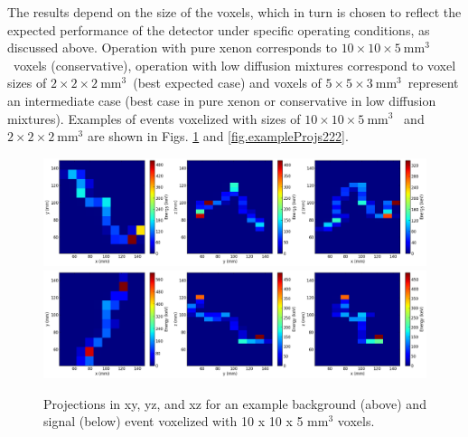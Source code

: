 \documentclass[a4paper,11pt]{article}
\begin{document}
The results depend on the size of the voxels, which in turn is chosen to reflect the expected performance of the detector under specific operating conditions, as discussed above. Operation with pure xenon corresponds to $10 \times 10 \times 5 \mathrm{~mm^3}$~voxels (conservative), operation with low diffusion mixtures correspond to voxel sizes of $2 \times 2 \times 2 \mathrm{~mm^3}$~(best expected case) and voxels of $5 \times 5 \times 3 \mathrm{~mm^3}$~represent an intermediate case (best case in pure xenon or conservative in low diffusion mixtures).  Examples of events voxelized with sizes of $10 \times 10 \times 5 \mathrm{~mm^3}$~ and
$2 \times 2 \times 2 \mathrm{~mm^3}$ are shown in Figs. \ref{fig.exampleProjs10105} and \ref{fig.exampleProjs222}.

\begin{figure}[!htb]
	\centering
	\includegraphics[scale=0.36]{fig/plt_h2D_vox_dnn3d_NEXT100_Paolina10105_v10x10x5_r200x200x200_2_bg.png}
	\includegraphics[scale=0.36]{fig/plt_h2D_vox_dnn3d_NEXT100_Paolina10105_v10x10x5_r200x200x200_3_si.png}
	\caption{\label{fig.exampleProjs10105}Projections in xy, yz, and xz for an example background (above) and signal (below) event voxelized with 10 x 10 x 5 mm$^3$ voxels.}
\end{figure}
\end{document}
